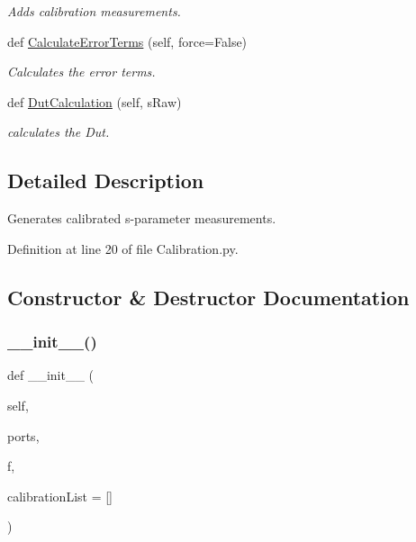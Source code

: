 \begin{DoxyCompactItemize}
\begin{DoxyCompactList}\small\item\em Adds calibration measurements. \end{DoxyCompactList}\item 
def \hyperlink{classSignalIntegrity_1_1Measurement_1_1Calibration_1_1Calibration_1_1Calibration_a97348b9e4c449174b1e735563e3a8a9c}{Calculate\+Error\+Terms} (self, force=False)
\begin{DoxyCompactList}\small\item\em Calculates the error terms. \end{DoxyCompactList}\item 
def \hyperlink{classSignalIntegrity_1_1Measurement_1_1Calibration_1_1Calibration_1_1Calibration_ac257ff0d436f9c02507349f82ece9e56}{Dut\+Calculation} (self, s\+Raw)
\begin{DoxyCompactList}\small\item\em calculates the Dut. \end{DoxyCompactList}\end{DoxyCompactItemize}


\subsection{Detailed Description}
Generates calibrated s-\/parameter measurements. 

Definition at line 20 of file Calibration.\+py.



\subsection{Constructor \& Destructor Documentation}
\mbox{\label{classSignalIntegrity_1_1Measurement_1_1Calibration_1_1Calibration_1_1Calibration_a09488d31cef60d14cb3ebfe3f29b963b}} 
\subsubsection{\texorpdfstring{\+\_\+\+\_\+init\+\_\+\+\_\+()}{\_\_init\_\_()}}
{\footnotesize\ttfamily def \+\_\+\+\_\+init\+\_\+\+\_\+ (\begin{DoxyParamCaption}\item[{}]{self,  }\item[{}]{ports,  }\item[{}]{f,  }\item[{}]{calibration\+List = {\ttfamily \mbox{[}\mbox{]}} }\end{DoxyParamCaption})}



